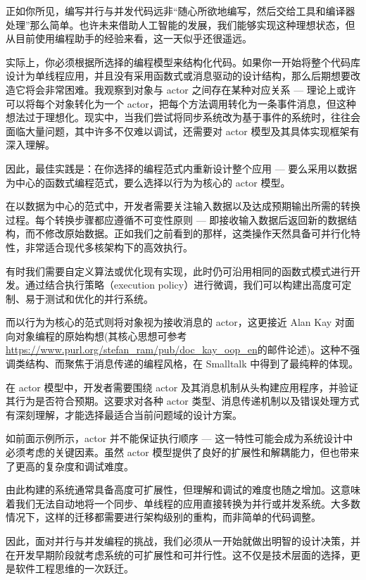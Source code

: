 正如你所见，编写并行与并发代码远非“随心所欲地编写，然后交给工具和编译器处理”那么简单。也许未来借助人工智能的发展，我们能够实现这种理想状态，但从目前使用编程助手的经验来看，这一天似乎还很遥远。

实际上，你必须根据所选择的编程模型来结构化代码。如果你一开始将整个代码库设计为单线程应用，并且没有采用函数式或消息驱动的设计结构，那么后期想要改造它将会非常困难。我观察到对象与 actor 之间存在某种对应关系 --- 理论上或许可以将每个对象转化为一个 actor，把每个方法调用转化为一条事件消息，但这种想法过于理想化。现实中，当我们尝试将同步系统改为基于事件的系统时，往往会面临大量问题，其中许多不仅难以调试，还需要对 actor 模型及其具体实现框架有深入理解。

因此，最佳实践是：在你选择的编程范式内重新设计整个应用 --- 要么采用以数据为中心的函数式编程范式，要么选择以行为为核心的 actor 模型。

在以数据为中心的范式中，开发者需要关注输入数据以及达成预期输出所需的转换过程。每个转换步骤都应遵循不可变性原则 --- 即接收输入数据后返回新的数据结构，而不修改原始数据。正如我们之前看到的那样，这类操作天然具备可并行化特性，非常适合现代多核架构下的高效执行。

有时我们需要自定义算法或优化现有实现，此时仍可沿用相同的函数式模式进行开发。通过结合执行策略（execution policy）进行微调，我们可以构建出高度可定制、易于测试和优化的并行系统。

而以行为为核心的范式则将对象视为接收消息的 actor，这更接近 Alan Kay 对面向对象编程的原始构想(其核心思想可参考\url{https://www.purl.org/stefan_ram/pub/doc_kay_oop_en}的邮件论述)。这种不强调类结构、而聚焦于消息传递的编程风格，在 Smalltalk 中得到了最纯粹的体现。

在 actor 模型中，开发者需要围绕 actor 及其消息机制从头构建应用程序，并验证其行为是否符合预期。这要求对各种 actor 类型、消息传递机制以及错误处理方式有深刻理解，才能选择最适合当前问题域的设计方案。

如前面示例所示，actor 并不能保证执行顺序 --- 这一特性可能会成为系统设计中必须考虑的关键因素。虽然 actor 模型提供了良好的扩展性和解耦能力，但也带来了更高的复杂度和调试难度。

由此构建的系统通常具备高度可扩展性，但理解和调试的难度也随之增加。这意味着我们无法自动地将一个同步、单线程的应用直接转换为并行或并发系统。大多数情况下，这样的迁移都需要进行架构级别的重构，而非简单的代码调整。

因此，面对并行与并发编程的挑战，我们必须从一开始就做出明智的设计决策，并在开发早期阶段就考虑系统的可扩展性和可并行性。这不仅是技术层面的选择，更是软件工程思维的一次跃迁。